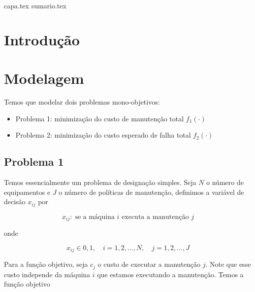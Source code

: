 \documentclass[
	12pt,				%
	oneside,			%
	a4paper,			%
	chapter=TITLE,
	sumario=tradicional,
	english,			%
	brazil				%
]{abntex2}
\newcommand{\un}[1]{\;\text{#1}}
\begin{document}

\frenchspacing 

{capa.tex}
{sumario.tex}

\textual

\pagestyle{simple}
	
\chapter{Introdução}\label{cap:introducao} 

\lipsum[1-2]

\chapter{Modelagem}\label{cap:modelagem} 

Temos que modelar dois problemas mono-objetivos:

\begin{itemize}
	\item Problema 1: minimização do custo de manutenção total $f_1 (\cdot)$
	\item Problema 2: minimização do custo esperado de falha total $f_2 (\cdot)$
\end{itemize}

\section{Problema 1}

Temos essencialmente um problema de designação simples. Seja $N$ o número de 
equipamentos e $J$ o número de políticas de manutenção, definimos a variável de decisão $x_{ij}$ 
por

\begin{equation}
	x_{ij}: \un{se a máquina $i$ executa a manutenção $j$}
\end{equation}

\noindent onde 

\[ x_{ij} \in {0,1} , \quad i = {1, 2, ..., N}, \quad j = {1, 2, ..., J} \]

Para a função objetivo, seja $c_j$ o custo de executar a manutenção $j$. Note que esse custo 
independe da máquina $i$ que estamos executando a manutenção. Temos a função objetivo  
\end{document}
